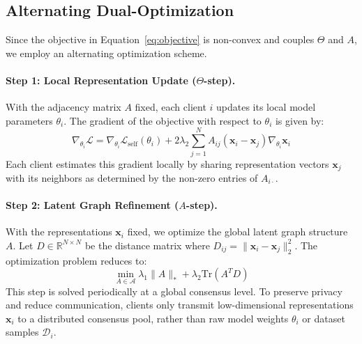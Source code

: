 \subsection{Alternating Dual-Optimization}
Since the objective in Equation~\ref{eq:objective} is non-convex and couples $\Theta$ and $A$, we employ an alternating optimization scheme.

\paragraph{Step 1: Local Representation Update ($\Theta$-step).}
With the adjacency matrix $A$ fixed, each client $i$ updates its local model parameters $\theta_i$. The gradient of the objective with respect to $\theta_i$ is given by:
\begin{equation}
  \nabla_{\theta_i} \mathcal{L} = \nabla_{\theta_i} \mathcal{L}_{\text{self}}(\theta_i) + 2 \lambda_2 \sum_{j=1}^N A_{ij} (\mathbf{x}_i - \mathbf{x}_j) \nabla_{\theta_i} \mathbf{x}_i
\end{equation}
Each client estimates this gradient locally by sharing representation vectors $\mathbf{x}_j$ with its neighbors as determined by the non-zero entries of $A_{i\cdot}$.

\paragraph{Step 2: Latent Graph Refinement ($A$-step).}
With the representations $\mathbf{x}_i$ fixed, we optimize the global latent graph structure $A$. Let $D \in \mathbb{R}^{N \times N}$ be the distance matrix where $D_{ij} = \|\mathbf{x}_i - \mathbf{x}_j\|_2^2$. The optimization problem reduces to:
\begin{equation}
  \min_{A \in \mathcal{A}} \lambda_1 \|A\|_* + \lambda_2 \text{Tr}(A^T D)
\end{equation}
This step is solved periodically at a global consensus level. To preserve privacy and reduce communication, clients only transmit low-dimensional representations $\mathbf{x}_i$ to a distributed consensus pool, rather than raw model weights $\theta_i$ or dataset samples $\mathcal{D}_i$.
